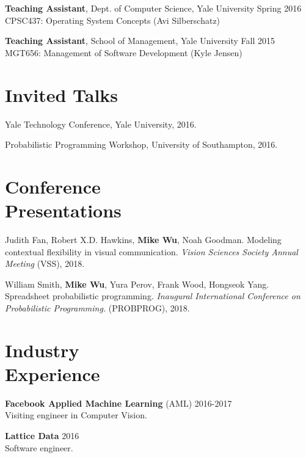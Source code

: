 \documentclass[margin, 10pt]{res} %
\begin{document}
\begin{resume}
\textbf{Teaching Assistant}, Dept. of Computer Science, Yale University \hfill Spring 2016\\
CPSC437: Operating System Concepts (Avi Silberschatz)

\textbf{Teaching Assistant}, School of Management, Yale University \hfill Fall 2015\\
MGT656: Management of Software Development (Kyle Jensen)


\section{Invited Talks}

Yale Technology Conference, Yale University, 2016.

Probabilistic Programming Workshop, University of Southampton, 2016.

\section{Conference \\ Presentations}

Judith Fan, Robert X.D. Hawkins, \textbf{Mike Wu}, Noah Goodman. Modeling contextual flexibility in visual communication. \textit{Vision Sciences Society Annual Meeting} (VSS), 2018.

William Smith, \textbf{Mike Wu}, Yura Perov, Frank Wood, Hongseok Yang. Spreadsheet probabilistic programming. \textit{Inaugural International Conference on Probabilistic Programming.} (PROBPROG), 2018.


\section{Industry \\ Experience}

\textbf{Facebook Applied Machine Learning} (AML) \hfill 2016-2017 \\
Visiting engineer in Computer Vision.

\textbf{Lattice Data} \hfill 2016 \\
Software engineer.


\end{resume}
\end{document}
